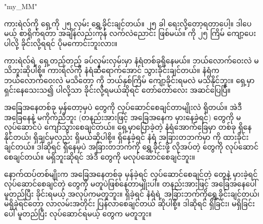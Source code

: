 \chapter{ }
\XeTeXlinebreaklocale "my_MM"  %
\begin{sloppypar}
ကားရဲလ်ကို ရှေ့ကို ၂၅ လှမ်း ရွှေ့ခိုင်းချင်တယ်။  ၂၅ ခါ ရေးလို့‌တော့ရတာပေါ့။ ဒါပေမယ့် စာရိုက်ရတာ အချိန်လည်းကုန် လက်လဲညောင်း ဖြစ်မယ်။ {} ကို ၂၅ ကြိမ် ကျော့ပေးပါလို့ ခိုင်းလို့ရရင် ပိုမကောင်းဘူးလား။ 

ကားရဲလ်ရဲ့ ရှေ့တည့်တည့် ခပ်လှမ်းလှမ်းမှာ နံရံတစ်ခုရှိနေမယ်။ ဘယ်လောက်ဝေးလဲ မသိဘူးဆိုပါစို့။ ကားရဲလ်ကို နံရံဆီရောက်အောင် သွားခိုင်းချင်တယ်။ နံရံက ဘယ်လောက်ဝေးလဲ မသိတော့ {} ကို ဘယ်နှစ်ကြိမ် ကျော့ခိုင်းရမလဲ မသိနိုင်ဘူး။ ရှေ့မှာရှင်းနေသေးသ၍  ပါလို့သာ ခိုင်းလို့ရမယ်ဆိုရင် တော်တော်လေး အဆင်ပြေပြီ။  

အခြေအနေတစ်ခု မှန်တော့မှပဲ \mmcommand တွေကို  လုပ်ဆောင်စေချင်တာမျိုးလဲ ရှိတယ်။ အဲဒီ အခြေနေနဲ့ မကိုက်ညီဘူး (တနည်းအားဖြင့် အခြေအနေက မှားနေခဲ့ရင်) \mmcommand တွေကို မလုပ်ဆောင်ပဲ ကျော်သွားစေချင်တယ်။ ရှေ့မှာပြောခဲ့တဲ့ နံရံအောက််ခြေမှာ \mmbeeper တစ်ခု ရှိနေနိုင်တယ်၊ ရှိချင်မှလည်း ရှိမယ်ဆိုပါစို့။ \mmbeeper ရှိနေခဲ့ရင် နံရံ အခြားတဘက်မှာ \mmbeeper ကို ထားခိုင်းချင်တယ်။  ဒါဆိုရင် \mmbeeper ရှိနေမှပဲ အခြားတဘက်ကို ရွှေ့ခိုင်းဖို့ လိုအပ်တဲ့ \mmcommand တွေကို လုပ်ဆောင်စေချင်တယ်။ \mmbeeper မရှိဘူးဆိုရင် အဲဒီ \mmcommand တွေကို မလုပ်ဆောင်စေချင်ဘူး။  

 နောက်ထပ်တစ်မျိုးက အခြေအနေတစ်ခု မှန်ခဲ့ရင် လုပ်ဆောင်စေချင်တဲ့ \mmcommand တွေနဲ့ မှားခဲ့ရင်‌ လုပ်ဆောင်စေချင်တဲ့ \mmcommand ‌တွေကို မတူပဲဖြစ်နေတာမျိုးပါ။ တနည်းအားဖြင့် အခြေအနေပေါ် မူတည်ပြီး ခိုင်းရမယ့် အလုပ်ကမတူဘူး။ \mmbeeper ရှိခဲ့ရင် နံရံရဲ့ အခြားဘက်ကိုရွှေ့ခိုင်းချင်တယ်၊ မရှိခဲ့ရင်တော့ လာလမ်းအတိုင်း ပြန်လာစေချင်တယ် ဆိုပါစို့။ ဒါဆိုရင် \mmbeeper ရှိခြင်း၊ မရှိခြင်းပေါ် မူတည်ပြီး လုပ်ဆောင်ရမယ့် \mmcommand တွေက  မတူဘူး။ 

 


\end{sloppypar}
